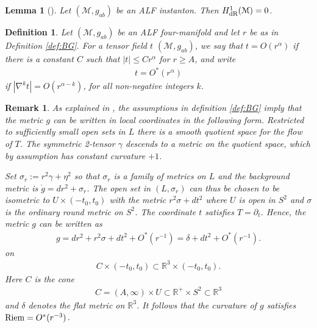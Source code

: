 \documentclass[a4paper,11pt,reqno]{amsart}
\newcommand{\Reals}{\mathbb{R}}
\newcommand{\Riem}{\mathop{\rm Riem}}
\newcommand{\cM}{\mathcal{M}}
\theoremstyle{plain}
\newtheorem{lemma}[thm]{Lemma}
\newtheorem{definition}[thm]{Definition}
\newtheorem{remark}[thm]{Remark}
\newcommand{\gring}{\mathring{g}}
\numberwithin{equation}{section}
\begin{document}
\begin{lemma}[] \label{lem:H1zero} 
Let $(\cM, g_{ab})$ be an ALF instanton. Then $H^1_{\text{\rm dR}}(\cM) = 0$. 
\end{lemma} 

\begin{definition}%
\label{def:ordo} 
Let $(\cM, g_{ab})$ be an ALF four-manifold and let $r$ be as in Definition \ref{def:BG}. For a tensor field $t$ $(\cM, g_{ab})$, we say that  $t =  O(r^\alpha)$ if  there is a constant $C$ such that $|t| \leq C r^\alpha$ for $r \geq A$, and write 
\begin{align} 
t = O^*(r^\alpha)
\end{align} 
if $|\nabla^k t| = O(r^{\alpha-k})$, for all non-negative integers $k$. 
\end{definition} 


\begin{remark}\label{rem:cone}   
As explained in \cite[Proof~of~Prop.~1.5]{Biquard:Gauduchon}, the assumptions in definition \ref{def:BG} imply that the metric $g$ can be written in local coordinates in the following form. Restricted to sufficiently small open sets in $L$ there is a smooth quotient space for the flow of $T$. The symmetric 2-tensor $\gamma$ descends to a metric on the quotient space, which by assumption has constant curvature $+1$. 

Set $\sigma_r := r^2\gamma + \eta^2$ so that $\sigma_r$ is a family of metrics on $L$ and the background metric is $\gring = dr^2 + \sigma_r$. The open set in $(L,\sigma_r)$ can thus be chosen to be isometric to $U \times (-t_0,t_0)$ with the metric $r^2 \sigma + dt^2$  where $U$ is open in $S^2$ and $\sigma$ is the ordinary round metric on $S^2$. The coordinate $t$ satisfies $T = \partial_t$. Hence, the metric $g$ can be written as 
\begin{align} 
g = dr^2 + r^2 \sigma + dt^2 + O^*(r^{-1})
= \delta + dt^2 + O^*(r^{-1}).
\end{align} 
on 
\begin{align} 
C \times (-t_0,t_0) \subset \Reals^3 \times (-t_0,t_0). 
\end{align} 
Here $C$ is the cone 
\begin{align} 
C = (A, \infty) \times U \subset \Reals^+ \times S^2 \subset \Reals^3  
\end{align} 
and $\delta$ denotes the flat metric on $\Reals^3$. 
It follows that the curvature of $g$ satisfies $\Riem = O^*(r^{-3})$.
\end{remark} 
\end{document}
